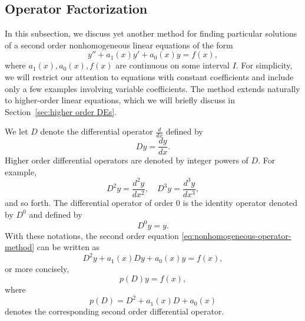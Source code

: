 		
	
	\subsection{Operator Factorization}\label{subsec:method of operators}
	In this subsection, we discuss yet another method for finding  particular solutions of a second order nonhomogeneous linear equations of the form
	\begin{equation}\label{eq:nonhomogeneous-operator-method}
		y'' + a_1(x) y' + a_0(x) y = f(x),
	\end{equation}
	where 
	\(a_1(x), a_0(x), f(x)\)
	are continuous on some interval $I$. 
	For simplicity, we will restrict our attention to equations with constant coefficients and include only a few examples involving variable coefficients. The method extends naturally to higher-order linear equations, which we will briefly discuss in Section~\ref{sec:higher order DEs}.
	
	We let \(D\)  denote the differential operator \(\frac{d}{dx}\) defined by 
	\[Dy = \frac{dy}{dx}.\]	Higher order differential operators are  denoted by integer powers of $D.$ For example,
	\[
		D^2y = \frac{d^2y}{dx^2},\quad 
		D^3y = \frac{d^3y}{dx^3},
	\] and so forth. The differential operator of order $0$  is the identity operator denoted by $D^0$ and defined by \[ D^0y=y.\]  With these notations,
the second order equation \eqref{eq:nonhomogeneous-operator-method} can be written as
\[D^2y + a_1(x) Dy+a_0(x)y= f(x),\] or more concisely, 
\[p(D)y= f(x),\] where \[p(D) = D^2 + a_1(x) D+a_0(x)\] denotes the corresponding second order differential  operator.

